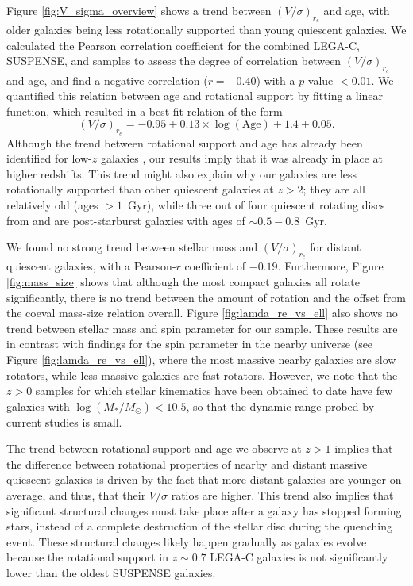 \documentclass{aa}
\newcommand{\vsigma}{$(V/\sigma)_{r_e}$}
\begin{document}
Figure \ref{fig:V_sigma_overview} shows a trend between $(V/\sigma)_{r_e}$ and age, with older galaxies being less rotationally supported than young quiescent galaxies. We calculated the Pearson correlation coefficient for the combined LEGA-C, SUSPENSE, and \citet{ANewman2018b} samples to assess the degree of correlation between \vsigma and age, and find a negative correlation ($r = -0.40$) with a $p$-value $<0.01$. We quantified this relation between age and rotational support by fitting a linear function, which resulted in a best-fit relation of the form
\begin{equation}
    (V/\sigma)_{r_e} = -0.95 \pm 0.13 \times \log(\text{Age}) + 1.4 \pm 0.05.
\end{equation}
Although the trend between rotational support and age has already been identified for low-$z$ galaxies \citep{JVandeSande2018, SCroom2024}, our results imply that it was already in place at higher redshifts. This trend might also explain why our galaxies are less rotationally supported than other quiescent galaxies at $z>2$; they are all relatively old (ages $> 1$~Gyr), while three out of four quiescent rotating discs from \citet{ANewman2018b} and \citet{FdEugenio2024} are post-starburst galaxies with ages of $\sim0.5-0.8$~Gyr.

We found no strong trend between stellar mass and $(V/\sigma)_{r_e}$ for distant quiescent galaxies, with a Pearson-$r$ coefficient of $-0.19$. Furthermore, Figure \ref{fig:mass_size} shows that although the most compact galaxies all rotate significantly, there is no trend between the amount of rotation and the offset from the coeval mass-size relation overall. Figure \ref{fig:lamda_re_vs_ell} also shows no trend between stellar mass and spin parameter for our sample. These results are in contrast with findings for the spin parameter in the nearby universe (see Figure \ref{fig:lamda_re_vs_ell}), where the most massive nearby galaxies are slow rotators, while less massive galaxies are fast rotators. However, we note that the $z>0$ samples for which stellar kinematics have been obtained to date have few galaxies with $\log(M_*/M_{\odot})<10.5$, so that the dynamic range probed by current studies is small. 

The trend between rotational support and age we observe at $z>1$ implies that the difference between rotational properties of nearby and distant massive quiescent galaxies is driven by the fact that more distant galaxies are younger on average, and thus, that their $V/\sigma$ ratios are higher. This trend also implies that significant structural changes must take place after a galaxy has stopped forming stars, instead of a complete destruction of the stellar disc during the quenching event. These structural changes likely happen gradually as galaxies evolve because the rotational support in $z\sim0.7$ LEGA-C galaxies is not significantly lower than the oldest SUSPENSE galaxies.
\end{document}
